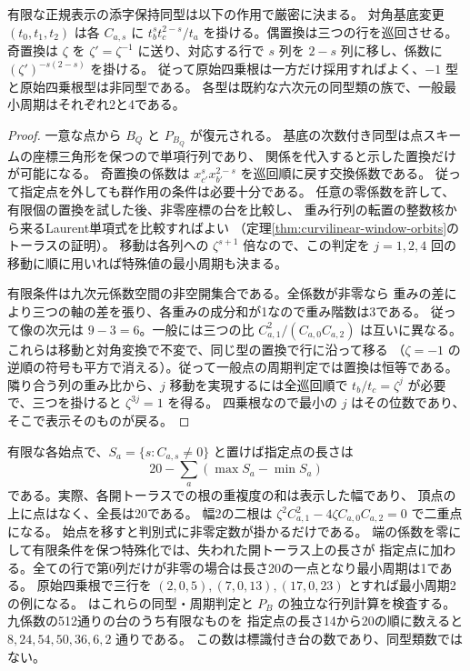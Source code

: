 \begin{corollary}\label{cor:quantum-tangent-invariants}
有限な正規表示の添字保持同型は以下の作用で厳密に決まる。
対角基底変更 $(t_0,t_1,t_2)$ は各 $C_{a,s}$ に
$t_b^s t_c^{2-s}/t_a$ を掛ける。偶置換は三つの行を巡回させる。
奇置換は $\zeta$ を $\zeta'=\zeta^{-1}$ に送り、対応する行で
$s$ 列を $2-s$ 列に移し、係数に $(\zeta')^{-s(2-s)}$ を掛ける。
従って原始四乗根は一方だけ採用すればよく、$-1$ 型と原始四乗根型は非同型である。
各型は既約な六次元の同型類の族で、一般最小周期はそれぞれ2と4である。
\end{corollary}
\begin{proof}
一意な点から $B_Q$ と $P_{B_Q}$ が復元される。
基底の次数付き同型は点スキームの座標三角形を保つので単項行列であり、
関係を代入すると示した置換だけが可能になる。
奇置換の係数は $x_{c'}^s x_{b'}^{2-s}$ を巡回順に戻す交換係数である。
従って指定点を外しても群作用の条件は必要十分である。
任意の零係数を許して、有限個の置換を試した後、非零座標の台を比較し、
重み行列の転置の整数核から来るLaurent単項式を比較すればよい
（定理\ref{thm:curvilinear-window-orbits}のトーラスの証明）。
移動は各列への $\zeta^{s+1}$ 倍なので、この判定を
$j=1,2,4$ 回の移動に順に用いれば特殊値の最小周期も決まる。

有限条件は九次元係数空間の非空開集合である。全係数が非零なら
重みの差により三つの軸の差を張り、各重みの成分和が1なので重み階数は3である。
従って像の次元は $9-3=6$。一般には三つの比
$C_{a,1}^2/(C_{a,0}C_{a,2})$ は互いに異なる。
これらは移動と対角変換で不変で、同じ型の置換で行に沿って移る
（$\zeta=-1$ の逆順の符号も平方で消える）。従って一般点の周期判定では置換は恒等である。
隣り合う列の重み比から、$j$ 移動を実現するには全巡回順で
$t_b/t_c=\zeta^j$ が必要で、三つを掛けると $\zeta^{3j}=1$ を得る。
四乗根なので最小の $j$ はその位数であり、そこで表示そのものが戻る。
\end{proof}

有限な各始点で、$S_a=\{s:C_{a,s}\ne0\}$ と置けば指定点の長さは
\[
                  20-\sum_a(\max S_a-\min S_a)
\]
である。実際、各開トーラスでの根の重複度の和は表示した幅であり、
頂点の上に点はなく、全長は20である。
幅2の二根は $\zeta^2 C_{a,1}^2-4\zeta C_{a,0} C_{a,2}=0$ で二重点になる。
始点を移すと判別式に非零定数が掛かるだけである。
端の係数を零にして有限条件を保つ特殊化では、失われた開トーラス上の長さが
指定点に加わる。全ての行で第0列だけが非零の場合は長さ20の一点となり最小周期は1である。
原始四乗根で三行を $(2,0,5),(7,0,13),(17,0,23)$ とすれば最小周期2の例になる。
 はこれらの同型・周期判定と
$P_B$ の独立な行列計算を検査する。九係数の512通りの台のうち有限なものを
指定点の長さ14から20の順に数えると $8,24,54,50,36,6,2$ 通りである。
この数は標識付き台の数であり、同型類数ではない。
